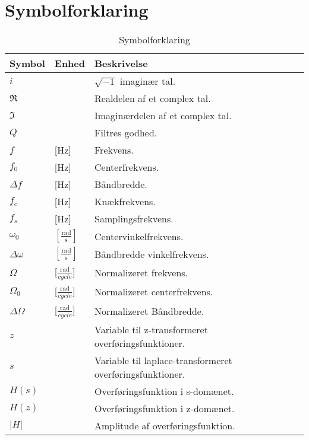 \chapter{Symbolforklaring} \label{bilag:symbol}

\begin{table}[h!]
\centering
\caption{Symbolforklaring}
\label{tab:symboler}
\begin{threeparttable}
\begin{tabular}{l l l}
\toprule
\multicolumn{1}{l}{Symbol}       &
\multicolumn{1}{l}{Enhed}        &
\multicolumn{1}{l}{Beskrivelse}  \\ 
\midrule
$i$\tnote{*}		&					& $\sqrt{-1}$ imaginær tal.	\\
$\Re$\tnote{*}		&					& Realdelen af et complex tal.	\\
$\Im$\tnote{*}		&					& Imaginærdelen af et complex tal.	\\
$Q$\tnote{*}        &                   & Filtres godhed.\\
$f$					&	[\si{\hertz}]	& Frekvens.	\\
$f_0$				&	[\si{\hertz}]	& Centerfrekvens.	\\
$\Delta f$			&	[\si{\hertz}]	& Båndbredde.	\\
$f_c$				&	[\si{\hertz}]	& Knækfrekvens.	\\
$f_s$				&	[\si{\hertz}]	& Samplingsfrekvens.	\\
$\omega_0$			&	$[\frac{\si{\radian}}{\si{\second}}]$	& Centervinkelfrekvens.	\\
$\Delta \omega$		&	$[\frac{\si{\radian}}{\si{\second}}]$	& Båndbredde vinkelfrekvens.	\\
$\Omega$	&	[$\frac{\si{\radian}}{cycle}$]				& Normalizeret frekvens.	\\
$\Omega_0$	&	[$\frac{\si{\radian}}{cycle}$]				& Normalizeret centerfrekvens.	\\
$\Delta \Omega$	&	[$\frac{\si{\radian}}{cycle}$]				& Normalizeret Båndbredde.	\\
$z$\tnote{*}		&					& Variable til z-transformeret overføringsfunktioner.\\
$s$\tnote{*}		&					& Variable til laplace-transformeret overføringsfunktioner.\\
$H(s)$\tnote{*}	    &		            & Overføringsfunktion i s-domænet.	\\
$H(z)$\tnote{*}	    &		            & Overføringsfunktion i z-domænet.	\\
$|H|$\tnote{*}	    &		            & Amplitude af overføringsfunktion.	\\

\end{tabular}
\end{threeparttable}
\end{table}
